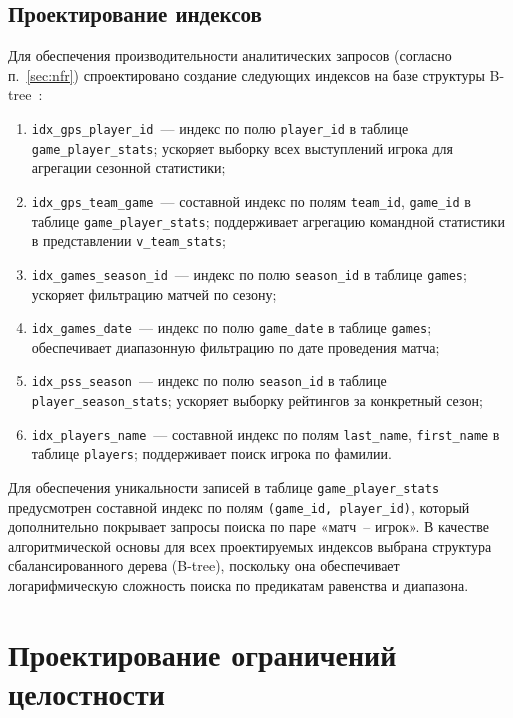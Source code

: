 \subsection{Проектирование индексов}\label{subsec:indexes}

Для обеспечения производительности аналитических запросов (согласно п.~\ref{sec:nfr})
спроектировано создание следующих индексов на базе структуры B-tree~\cite{connolly}:
\begin{enumerate}
    \item \texttt{idx\_gps\_player\_id}~--- индекс по полю \texttt{player\_id}
          в таблице \texttt{game\_player\_stats}; ускоряет выборку всех выступлений
          игрока для агрегации сезонной статистики;
    \item \texttt{idx\_gps\_team\_game}~--- составной индекс по полям
          \texttt{team\_id}, \texttt{game\_id} в таблице \texttt{game\_player\_stats};
          поддерживает агрегацию командной статистики в представлении
          \texttt{v\_team\_stats};
    \item \texttt{idx\_games\_season\_id}~--- индекс по полю \texttt{season\_id}
          в таблице \texttt{games}; ускоряет фильтрацию матчей по сезону;
    \item \texttt{idx\_games\_date}~--- индекс по полю \texttt{game\_date} в таблице
          \texttt{games}; обеспечивает диапазонную фильтрацию по дате проведения
          матча;
    \item \texttt{idx\_pss\_season}~--- индекс по полю \texttt{season\_id} в таблице
          \texttt{player\_season\_stats}; ускоряет выборку рейтингов за конкретный
          сезон;
    \item \texttt{idx\_players\_name}~--- составной индекс по полям
          \texttt{last\_name}, \texttt{first\_name} в таблице \texttt{players};
          поддерживает поиск игрока по фамилии.
\end{enumerate}

Для обеспечения уникальности записей в таблице \texttt{game\_player\_stats}
предусмотрен составной индекс по полям \texttt{(game\_id, player\_id)}, который
дополнительно покрывает запросы поиска по паре «матч~-- игрок». В качестве
алгоритмической основы для всех проектируемых индексов выбрана структура
сбалансированного дерева (B-tree), поскольку она обеспечивает логарифмическую
сложность поиска по предикатам равенства и диапазона.



\section{Проектирование ограничений целостности}\label{sec:integrity-design}

